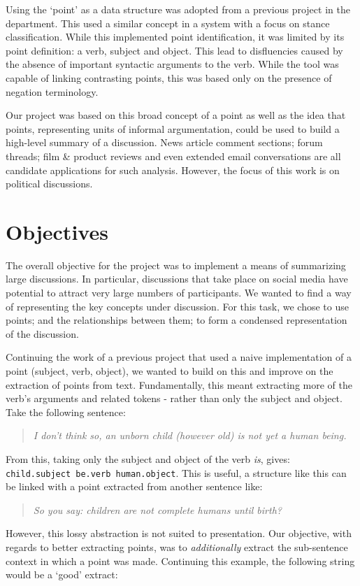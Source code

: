     Using the `point' as a data structure was adopted from a previous project in the department. This used a similar concept in a system with a focus on stance classification. While this implemented point identification, it was limited by its point definition: a verb, subject and object. This lead to disfluencies caused by the absence of important syntactic arguments to the verb. While the tool was capable of linking contrasting points, this was based only on the presence of negation terminology.

    Our project was based on this broad concept of a point as well as the idea that points, representing units of informal argumentation, could be used to build a high-level summary of a discussion. News article comment sections; forum threads; film \& product reviews and even extended email conversations are all candidate applications for such analysis. However, the focus of this work is on political discussions.

  \section{Objectives}
    The overall objective for the project was to implement a means of summarizing large discussions. In particular, discussions that take place on social media have potential to attract very large numbers of participants. We wanted to find a way of representing the key concepts under discussion. For this task, we chose to use points; and the relationships between them; to form a condensed representation of the discussion.

    Continuing the work of a previous project that used a naive implementation of a point (subject, verb, object), we wanted to build on this and improve on the extraction of points from text. Fundamentally, this meant extracting more of the verb's arguments and related tokens - rather than only the subject and object. Take the following sentence:

    \medskip
    \begin{center}
    \blockquote{\textit{I don't think so, an unborn child (however old) is not yet a human being.}}
    \end{center}
    \medskip

    From this, taking only the subject and object of the verb \textit{is}, gives: \texttt{child.subject be.verb human.object}. This is useful, a structure like this can be linked with a point extracted from another sentence like: \blockquote{\textit{So you say: children are not complete humans until birth?}}. However, this lossy abstraction is not suited to presentation. Our objective, with regards to better extracting points, was to \textit{additionally} extract the sub-sentence context in which a point was made. Continuing this example, the following string would be a `good' extract:

